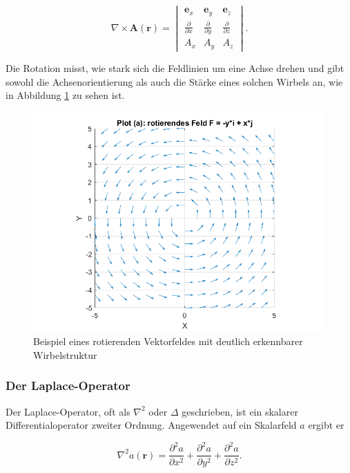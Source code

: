 \begin{equation}
\nabla \times \mathbf{A}(\mathbf{r}) = \begin{vmatrix}
    \mathbf{e}_x & \mathbf{e}_y & \mathbf{e}_z \\
    \frac{\partial}{\partial x} & \frac{\partial}{\partial y} & \frac{\partial}{\partial z}\\
    A_x & A_y & A_z
\end{vmatrix}.
\end{equation}

\noindent Die Rotation misst, wie stark sich die Feldlinien um eine Achse drehen und gibt sowohl die Achsenorientierung als auch die Stärke eines solchen Wirbels an, wie in Abbildung \ref{fig:RotationAlg} zu sehen ist.

\begin{figure}[h!]
    \centering
    \includegraphics[scale=0.4]{papers/helmholtz/images/rotierendes_Feld.png}
    \caption{Beispiel eines rotierenden Vektorfeldes mit deutlich erkennbarer Wirbelstruktur}
    \label{fig:RotationAlg}
\end{figure}

\subsubsection{Der Laplace-Operator}

Der Laplace-Operator, oft als $\nabla^2$ oder $\Delta$ geschrieben, ist ein skalarer Differentialoperator zweiter Ordnung. Angewendet auf ein Skalarfeld $a$ ergibt er

\begin{equation}
\nabla^2 a(\mathbf{r}) = \frac{\partial^2 a}{\partial x^2} + \frac{\partial^2 a}{\partial y^2} + \frac{\partial^2 a}{\partial z^2}.
\end{equation}

